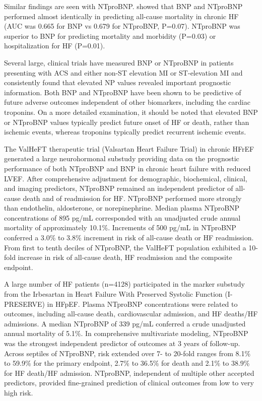 \documentclass[14pt,a4paper,onecolumn]{extarticle}
\begin{document}
Similar findings are seen with NTproBNP. \citep{Masson2006} showed that BNP and NTproBNP performed almost identically in predicting all-cause mortality in chronic HF (AUC was 0.665 for BNP vs 0.679 for NTproBNP, P=0.07). NTproBNP was superior to BNP for predicting mortality and morbidity (P=0.03) or hospitalization for HF (P=0.01). \citep{Masson2006}

Several large, clinical trials have measured BNP or NTproBNP in patients presenting with ACS and either non-ST elevation MI or ST-elevation MI and consistently found that elevated NP values revealed important prognostic information. Both BNP and NTproBNP have been shown to be predictive of future adverse outcomes independent of other biomarkers, including the cardiac troponins. On a more detailed examination, it should be noted that elevated BNP or NTproBNP values typically predict future onset of HF or death, rather than ischemic events, whereas troponins typically predict recurrent ischemic events. \citep{Gaggin2014}

The ValHeFT therapeutic trial (Valsartan Heart Failure Trial) in chronic HFrEF generated a large neurohormonal substudy providing data on the prognostic performance of both NTproBNP and BNP in chronic heart failure with reduced LVEF.  After comprehensive adjustment for demographic, biochemical, clinical, and imaging predictors, NTproBNP remained an independent predictor of all-cause death and of readmission for HF. NTproBNP performed more strongly than endothelin, aldosterone, or norepinephrine. Median plasma NTproBNP concentrations of 895 pg/mL corresponded with an unadjusted crude annual mortality of approximately 10.1\%. Increments of 500 pg/mL in NTproBNP conferred a 3.0\% to 3.8\% increment in risk of all-cause death or HF readmission. From first to tenth deciles of NTproBNP, the ValHeFT population exhibited a 10-fold increase in risk of all-cause death, HF readmission and the composite endpoint. \citep{bib3204}

A large number of HF patients (n=4128) participated in the marker substudy from the Irbesartan in Heart Failure With Preserved Systolic Function (I-PRESERVE) in HFpEF. Plasma NTproBNP concentrations were related to outcomes, including all-cause death, cardiovascular admission, and HF deaths/HF admissions. A median NTproBNP of 339 pg/mL conferred a crude unadjusted annual mortality of 5.1\%. In comprehensive multivariate modeling, NTproBNP was the strongest independent predictor of outcomes at 3 years of follow-up. Across septiles of NTproBNP, risk extended over 7- to 20-fold ranges from 8.1\% to 59.9\% for the primary endpoint, 2.7\% to 36.5\% for death and 2.1\% to 38.9\% for HF death/HF admission. NTproBNP, independent of multiple other accepted predictors, provided fine-grained prediction of clinical outcomes from low to very high risk. \citep{Komajda2011}
\end{document}
